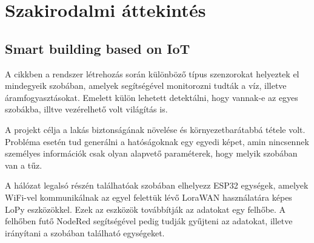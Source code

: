 
\chapter{Szakirodalmi áttekintés}


\section{Smart building based on IoT }
A cikkben\cite{smartbuildingiot:article} a rendszer létrehozás során különböző típus szenzorokat helyeztek el mindegyeik szobában, amelyek segítségével monitorozni tudták a víz, illetve áramfogyasztásokat. Emelett külön lehetett detektálni, hogy vannak-e az egyes szobákba, illtve vezérelhető volt világítás is.

A projekt célja a lakás biztonságának növelése és környezetbarátabbá tétele volt. Probléma esetén tud generálni a hatóságoknak egy egyedi képet, amin nincsennek személyes információk csak olyan alapvető paraméterek, hogy melyik szobában van a tűz.

A hálózat legalsó részén találhatóak szobában elhelyezz ESP32 egységek, amelyek WiFi-vel kommunikálnak az egyel felettük lévő LoraWAN használatára képes LoPy eszközökkel. Ezek az eszközök továbbítják az adatokat egy felhőbe. A felhőben futő NodeRed segítségével pedig tudják gyűjteni az adatokat, illetve irányítani a szobában található egységeket.
